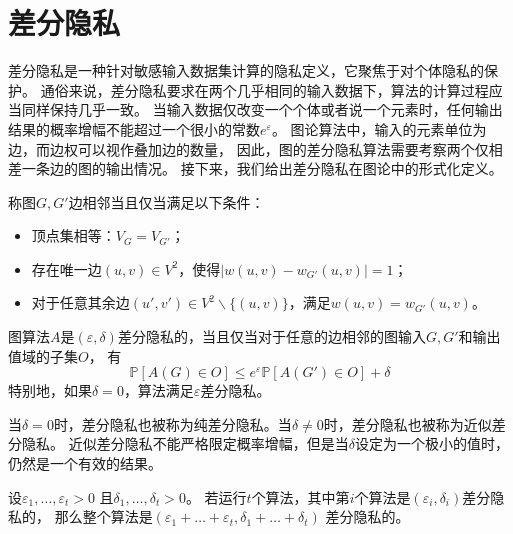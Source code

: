 \section{差分隐私}

差分隐私是一种针对敏感输入数据集计算的隐私定义，它聚焦于对个体隐私的保护。
通俗来说，差分隐私要求在两个几乎相同的输入数据下，算法的计算过程应当同样保持几乎一致。
当输入数据仅改变一个个体或者说一个元素时，任何输出结果的概率增幅不能超过一个很小的常数$e^\varepsilon$。
图论算法中，输入的元素单位为边，而边权可以视作叠加边的数量，
因此，图的差分隐私算法需要考察两个仅相差一条边的图的输出情况。
接下来，我们给出差分隐私在图论中的形式化定义。

\begin{definition}[边相邻]
    称图$G,G'$边相邻当且仅当满足以下条件：
    \begin{itemize}
        \item 顶点集相等：$V_G=V_{G'}$；
        \item 存在唯一边$(u,v)\in V^2$，使得$|w(u,v)-w_{G'}(u,v)|=1$；
        \item 对于任意其余边$(u',v')\in V^2\backslash \{(u,v)\}$，满足$w(u,v)=w_{G'}(u,v)$。
    \end{itemize}
\end{definition}

\begin{definition}[差分隐私]\cite{dwork2006differential}
    图算法$A$是$(\varepsilon,\delta)$差分隐私的，当且仅当对于任意的边相邻的图输入$G,G'$和输出值域的子集$O$，
    有
    \begin{equation*}
        \mathbb P[A(G)\in O]\leq e^\varepsilon\mathbb P[A(G')\in O]+\delta
    \end{equation*}
    特别地，如果$\delta=0$，算法满足$\varepsilon$差分隐私。
\end{definition}
当$\delta=0$时，差分隐私也被称为纯差分隐私。当$\delta\neq 0$时，差分隐私也被称为近似差分隐私。
近似差分隐私不能严格限定概率增幅，但是当$\delta$设定为一个极小的值时，仍然是一个有效的结果。

\begin{theorem}[基本组合]\cite{dwork2006calibrating}\cite{dwork2009differential}
    \label{the:basic}
    设$\varepsilon_1,\ldots,\varepsilon_t > 0$
    且$\delta_1,\ldots,\delta_t > 0$。
    若运行$t$个算法，其中第$i$个算法是$(\varepsilon_i,\delta_i)$差分隐私的，
    那么整个算法是$(\varepsilon_1 + \ldots + \varepsilon_t,\delta_1 + \ldots + \delta_t)$
    差分隐私的。
\end{theorem}

